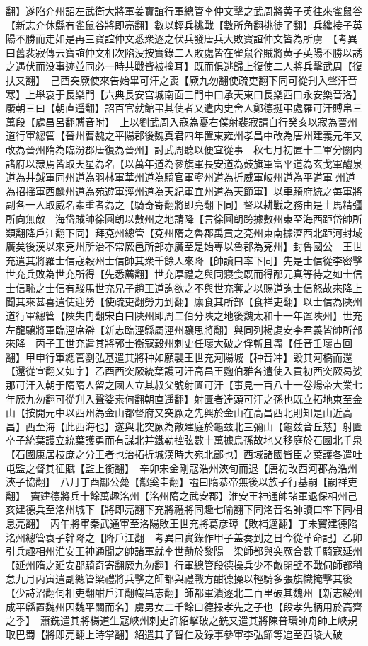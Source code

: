 翻】遂陷介州詔左武衛大將軍姜寶誼行軍總管李仲文擊之武周將黄子英往來雀鼠谷【新志介休縣有雀鼠谷將即亮翻】數以輕兵挑戰【數所角翻挑徒了翻】兵纔接子英陽不勝而走如是再三寶誼仲文悉衆逐之伏兵發唐兵大敗寶誼仲文皆為所虜　【考異曰舊裴寂傳云寶誼仲文相次陷没按實錄二人敗處皆在雀鼠谷賊將黄子英陽不勝以誘之遇伏而没事迹並同必一時共戰皆被擒耳】既而俱逃歸上復使二人將兵擊武周【復扶又翻】　己酉突厥使來告始畢可汗之喪【厥九勿翻使疏吏翻下同可從刋入聲汗音寒】上舉哀于長樂門【六典長安宫城南面三門中曰承天東曰長樂西曰永安樂音洛】廢朝三曰【朝直遥翻】詔百官就館弔其使者又遣内史舍人鄭德挺弔處羅可汗賻帛三萬段【處昌呂翻賻音附】　上以劉武周入寇為憂右僕射裴寂請自行癸亥以寂為晉州道行軍總管【晉州曹魏之平陽郡後魏真君四年置東雍州孝昌中改為唐州建義元年又改為晉州隋為臨汾郡唐復為晉州】討武周聽以便宜從事　秋七月初置十二軍分關内諸府以隸焉皆取天星為名【以萬年道為參旗軍長安道為鼓旗軍富平道為玄戈軍醴泉道為井鉞軍同州道為羽林軍華州道為騎官軍寧州道為折威軍岐州道為平道軍州道為招揺軍西麟州道為苑遊軍涇州道為天紀軍宜州道為天節軍】以車騎府統之每軍將副各一人取威名素重者為之【騎奇寄翻將即亮翻下同】督以耕戰之務由是士馬精彊所向無敵　海岱賊帥徐圓朗以數州之地請降【言徐圓朗跨據數州東至海西距岱帥所類翻降戶江翻下同】拜兗州總管【兗州隋之魯郡禹貢之兗州東南據濟西北距河封域廣矣後漢以來兗州所治不常厥邑所部亦廣至是始專以魯郡為兗州】封魯國公　王世充遣其將羅士信寇穀州士信帥其衆千餘人來降【帥讀曰率下同】先是士信從李密擊世充兵敗為世充所得【先悉薦翻】世充厚禮之與同寢食既而得邴元真等待之如士信士信恥之士信有駿馬世充兄子趙王道詢欲之不與世充奪之以賜道詢士信怒故來降上聞其來甚喜遣使迎勞【使疏吏翻勞力到翻】廪食其所部【食祥吏翻】以士信為陜州道行軍總管【陜失冉翻宋白曰陜州即周二伯分陜之地後魏太和十一年置陜州】世充左龍驤將軍臨涇席辯【新志臨涇縣屬涇州驤思將翻】與同列楊䖍安李君義皆帥所部來降　丙子王世充遣其將郭士衡寇穀州刺史任瓌大破之俘斬且盡【任音壬瓌古回翻】甲申行軍總管劉弘基遣其將种如願襲王世充河陽城【种音冲】毁其河橋而還【還從宣翻又如字】乙酉西突厥統葉護可汗高昌王麴伯雅各遣使入貢初西突厥曷娑那可汗入朝于隋隋人留之國人立其叔父號射匱可汗【事見一百八十一卷煬帝大業七年厥九勿翻可從刋入聲娑素何翻朝直遥翻】射匱者達頭可汗之孫也既立拓地東至金山【按開元中以西州為金山都督府又突厥之先興於金山在高昌西北則知是山近高昌】西至海【此西海也】遂與北突厥為敵建庭於龜兹北三彌山【龜兹音丘慈】射匱卒子統葉護立統葉護勇而有謀北并鐵勒控弦數十萬據烏孫故地又移庭於石國北千泉【石國康居枝庶之分王者也治拓折城漢時大宛北鄙也】西域諸國皆臣之葉護各遣吐屯監之督其征賦【監上銜翻】　辛卯宋金剛寇浩州浹旬而退【唐初改西河郡為浩州浹子協翻】　八月丁酉酅公薨【酅奚圭翻】謚曰隋恭帝無後以族子行基嗣【嗣祥吏翻】　竇建德將兵十餘萬趣洺州【洺州隋之武安郡】淮安王神通帥諸軍退保相州己亥建德兵至洺州城下【將即亮翻下充將禮將同趣七喻翻下同洺音名帥讀曰率下同相息亮翻】　丙午將軍秦武通軍至洛陽敗王世充將葛彦璋【敗補邁翻】丁未竇建德陷洺州總管袁子幹降之【降戶江翻　考異曰實錄作甲子盖奏到之日今從革命記】乙卯引兵趣相州淮安王神通聞之帥諸軍就李世勣於黎陽　梁師都與突厥合數千騎寇延州【延州隋之延安郡騎奇寄翻厥九勿翻】行軍總管段德操兵少不敵閉壁不戰伺師都稍怠九月丙寅遣副總管梁禮將兵擊之師都與禮戰方酣德操以輕騎多張旗幟掩擊其後【少詩沼翻伺相吏翻酣戶江翻幟昌志翻】師都軍潰逐北二百里破其魏州【新志綏州成平縣置魏州因魏平關而名】虜男女二千餘口德操孝先之子也【段孝先柄用於高齊之季】　蕭銑遣其將楊道生寇峽州刺史許紹擊破之銑又遣其將陳普環帥舟師上峽規取巴蜀【將即亮翻上時掌翻】紹遣其子智仁及錄事參軍李弘節等追至西陵大破